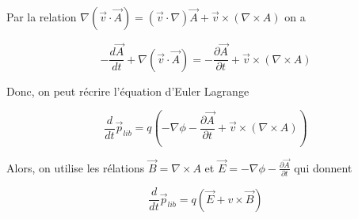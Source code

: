 \documentclass[french]{article}
\begin{document}
	Par la relation $\nabla (\vec{v} \cdot \vec{A}) = (\vec{v} \cdot \nabla) \vec{A} + \vec{v} \times (\nabla \times A)$ on a 
	
	\begin{equation}
		-\frac{d \vec{A}}{dt} + \nabla (\vec{v} \cdot \vec{A}) = - \frac{\partial \vec{A}}{\partial t} + \vec{v} \times (\nabla \times A)
	\end{equation}
	
	Donc, on peut récrire l'équation d'Euler Lagrange 
	
	\begin{equation}
		\frac{d}{dt} \vec{p}_{lib} = q \left( - \nabla \phi  - \frac{\partial \vec{A}}{\partial t} + \vec{v} \times (\nabla \times A)  \right)
	\end{equation}
	
	Alors, on utilise les rélations $\vec{B} = \nabla \times A$ et $\vec{E} =  - \nabla \phi  - \frac{\partial \vec{A}}{\partial t}$ qui donnent
	
	\begin{equation}
		\frac{d}{dt} \vec{p}_{lib} = q \left( \vec{E} + v \times \vec{B} \right)
	\end{equation}
	
	
\end{document}
